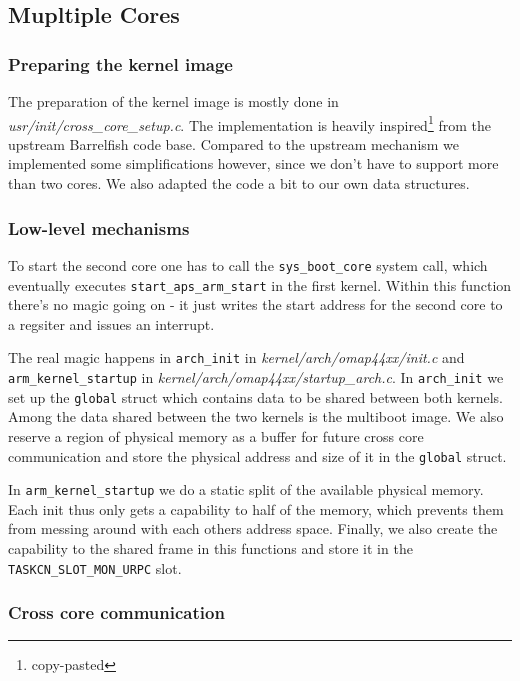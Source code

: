 \documentclass[a4paper,10pt]{article}
\newcommand{\filepath}[1]{\emph{ #1}}
\begin{document}
\subsection{Mupltiple Cores}

\subsubsection{Preparing the kernel image}

The preparation of the kernel image is mostly done in \filepath{usr/init/cross\_core\_setup.c}.
The implementation is heavily inspired\footnote{copy-pasted} from the upstream Barrelfish code base.
Compared to the upstream mechanism we implemented some simplifications however, since we don't have to support more than two cores.
We also adapted the code a bit to our own data structures.

\subsubsection{Low-level mechanisms}

To start the second core one has to call the \lstinline!sys_boot_core! system call, which eventually executes \lstinline!start_aps_arm_start! in the first kernel.
Within this function there's no magic going on - it just writes the start address for the second core to a regsiter and issues an interrupt.

The real magic happens in \lstinline!arch_init! in \filepath{kernel/arch/omap44xx/init.c} and  \lstinline{arm_kernel_startup} in \filepath{kernel/arch/omap44xx/startup\_arch.c}.
In \lstinline!arch_init! we set up the \lstinline!global! struct which contains data to be shared between both kernels.
Among the data shared between the two kernels is the multiboot image.
We also reserve a region of physical memory as a buffer for future cross core communication and store the physical address and size of it in the \lstinline!global! struct.

In \lstinline!arm_kernel_startup! we do a static split of the available physical memory.
Each init thus only gets a capability to half of the memory, which prevents them from messing around with each others address space.
Finally, we also create the capability to the shared frame in this functions and store it in the \lstinline!TASKCN_SLOT_MON_URPC! slot.

\subsubsection{Cross core communication}
\end{document}
